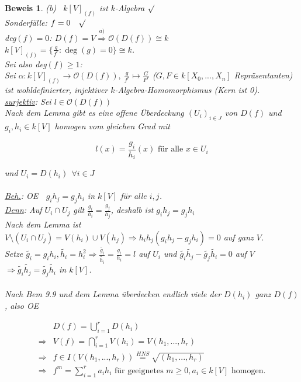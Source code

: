 \documentclass[a4paper,12pt]{report}
\theoremstyle{break}
\theoremstyle{nonumberbreak}
\theoremstyle{nonumberplain}
\newtheorem{Bew}{Beweis}
\renewcommand{\OE}{O\!\!E~}
\begin{document}
\begin{Bew}
(b)~ $k[V]_{(f)}$ ist $k$-Algebra $\surd$\\
Sonderfälle: $f=0~~~\surd$\\
deg$(f)=0$: $D(f)=V\stackrel{a)}{\Rightarrow}\mathcal{O}(D(f))\cong k$\\
$k[V]_{(f)}=\{\frac{g}{f^r}: \operatorname{deg}(g)=0\}\cong k$.\\
Sei also deg$(f)\geq 1$:\\
Sei $\alpha: k[V]_{(f)}\rightarrow \mathcal{O}(D(f)),~\frac{g}{f^r}\mapsto\frac{G}{F^r}$ ($G,F\in k[X_0,...,X_n]$ Repräsentanten) ist wohldefinierter, injektiver $k$-Algebra-Homomorphismus (Kern ist 0).\\
\underline{surjektiv}: Sei $l\in\mathcal{O}(D(f))$\\
Nach dem Lemma gibt es eine offene Überdeckung $(U_i)_{i\in J}$ von $D(f)$ und $g_i, h_i\in k[V]$ homogen vom gleichen Grad mit

$$l(x)=\frac{g_i}{h_i}(x) \text{ für alle } x\in U_i$$

und $U_i=D(h_i)~~\forall i\in J$\\\\
\underline{Beh.}: \OE $~~g_ih_j=g_jh_i$ in $k[V]$ für alle $i,j$.\\
\underline{Denn}: Auf $U_i\cap U_j$ gilt $\frac{g_i}{h_i}=\frac{g_j}{h_j}$, deshalb ist $g_ih_j=g_jh_i$\\
Nach dem Lemma ist $V\setminus (U_i\cap U_j)=V(h_i)\cup V(h_j)\Rightarrow h_ih_j(g_ih_j-g_jh_i)=0$ auf ganz $V$.\\
Setze $\tilde{g_i}=g_ih_i, \tilde{h_i}=h_i^2\Rightarrow \frac{\tilde{g_i}}{\tilde{h_i}}=\frac{g_i}{h_i}=l$ auf $U_i$ und $\tilde{g_i}\tilde{h_j}-\tilde{g_j}\tilde{h_i}=0$ auf $V$\\
$\Rightarrow \tilde{g_i}\tilde{h_j}=\tilde{g_j}\tilde{h_i}$ in $k[V]$.\\
\\
Nach Bem 9.9 und dem Lemma überdecken endlich viele der $D(h_i)$ ganz $D(f)$, also \OE

\begin{align*}
& D(f)=\bigcup_{i=1}^rD(h_i)\\
\Rightarrow & V(f)=\bigcap_{i=1}^rV(h_i)=V(h_1,...,h_r)\\
\Rightarrow & f\in I(V(h_1,...,h_r))\stackrel{HNS}{=} \sqrt{(h_1,...,h_r)}\\
\Rightarrow & f^m=\sum_{i=1}^ra_ih_i \text{ für geeignetes } m\geq 0, a_i\in k[V] \text{ homogen.}
\end{align*}


\end{Bew}
\end{document}
